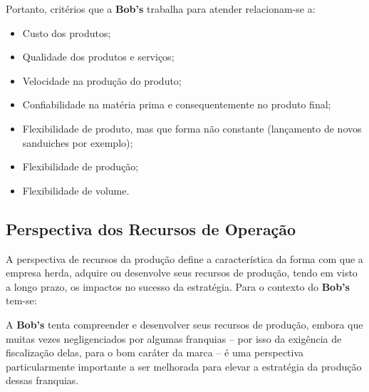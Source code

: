 			Portanto, critérios que a \textbf{Bob’s} trabalha para atender relacionam-se a:

			\begin{itemize}
				\item{Custo dos produtos;}
				\item{Qualidade dos produtos e serviços;}
				\item{Velocidade na produção do produto;}
				\item{Confiabilidade na matéria prima e consequentemente no produto final;}
				\item{Flexibilidade de produto, mas que forma não constante (lançamento de novos sanduiches por exemplo);}
				\item{Flexibilidade de produção;}
				\item{Flexibilidade de volume.}
			\end{itemize}


		\subsection[Perspectiva dos Recursos de Operação]{Perspectiva dos Recursos de Operação}
		\label{sec:dados_perspOeste}

			A perspectiva de recursos da produção define a característica da forma com que a empresa herda, adquire ou desenvolve seus recursos de produção, tendo em visto a longo prazo, os impactos no sucesso da estratégia. Para o contexto do \textbf{Bob’s} tem-se:

			A \textbf{Bob’s} tenta compreender e desenvolver seus recursos de produção, embora que muitas vezes negligenciados por algumas franquias – por isso da exigência de fiscalização delas, para o bom caráter da marca – é uma perspectiva particularmente importante a ser melhorada para elevar a estratégia da produção dessas franquias. \cite{lamonica}